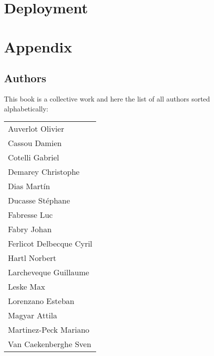 \documentclass[10pt,twoside,showtrims]{support/latex/sbabook}
\begin{document}





\part{Deployment}



\appendix

\part{Appendix}

\chapter{Authors}

This book is a collective work and here the list of all authors sorted alphabetically:

\begin{tabular}{l}
Auverlot Olivier  \\
Cassou Damien\\
Cotelli Gabriel\\
Demarey Christophe\\
Dias Martín\\
Ducasse Stéphane\\
Fabresse Luc\\
Fabry Johan\\
Ferlicot Delbecque Cyril\\
Hartl Norbert\\
Larcheveque Guillaume\\
Leske Max\\
Lorenzano Esteban\\
Magyar Attila\\
Martinez-Peck Mariano\\
Van Caekenberghe Sven\\
\end{tabular}

\backmatter
\end{document}
